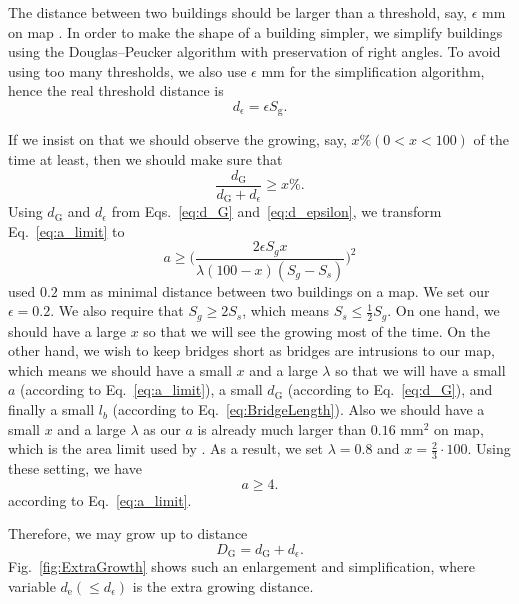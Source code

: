\documentclass[graybox]{svmult}
\begin{document}
The distance between two buildings should be larger than a threshold, say, 
$\epsilon$ mm on map \parencite{Stoter2009}.
In order to make the shape of a building simpler, we simplify buildings 
using the Douglas--Peucker algorithm \parencite{Douglas1973} with preservation 
of right angles.
To avoid using too many thresholds, we also use $\epsilon$ mm for the 
simplification algorithm, hence the real threshold distance 
is
\begin{equation}
\label{eq:d_epsilon}
d_\epsilon= \epsilon  S_\mathrm{g}.
\end{equation}

If we insist on that we should observe 
the growing, say, $x \% (0<x<100)$ of the time at least, then we should make 
sure that
\begin{equation}
\label{eq:a_limit}
\frac{d_\mathrm{G}}{d_\mathrm{G}+d_\epsilon} \ge x \%.
\end{equation}
Using $d_\mathrm{G}$ and $d_\epsilon$ from Eqs.~\ref{eq:d_G} 
and~\ref{eq:d_epsilon}, we transform Eq.~\ref{eq:a_limit} to
\begin{equation}
a \ge \Big(\frac{2 \epsilon S_g x}{\lambda (100-x) (S_g-S_s)}\Big)^2
\end{equation}
\textcite{Stoter2009} used $0.2$ mm as minimal distance between two buildings 
on a map. We set our $\epsilon=0.2$.
We also require 
that $S_g \ge 2 S_s$, which means $S_s \le \frac{1}{2} S_g$.
On one hand, we should have a large $x$ so that we will see the 
growing most of the time.
On the other hand, we wish to keep bridges short as bridges are intrusions to 
our map, which means we should have a small $x$ and a large $\lambda$ so that 
we will have a small 
$a$ (according to Eq.~\ref{eq:a_limit}), a small $d_\mathrm{G}$ (according to 
Eq.~\ref{eq:d_G}), and finally a small $l_b$ (according to 
Eq.~\ref{eq:BridgeLength}). Also we should have a small $x$ and a large 
$\lambda$ as our $a$ is already much larger than $0.16$ mm$^2$ on 
map, which is the area limit used by \textcite{Stoter2009}. As a result, we 
set 
$\lambda=0.8$ and $x=\frac{2}{3} \cdot 100$.
Using these setting, we have
\begin{equation}
a \ge 4.
\end{equation}
according to Eq.~\ref{eq:a_limit}.




Therefore, we may grow up to distance 
\[
D_\mathrm{G} = d_\mathrm{G} + d_\epsilon.
\]
Fig.~\ref{fig:ExtraGrowth} shows such an enlargement and simplification, 
where  
variable $d_\mathrm{e} (\le d_\epsilon)$ is the extra growing distance.
\end{document}
